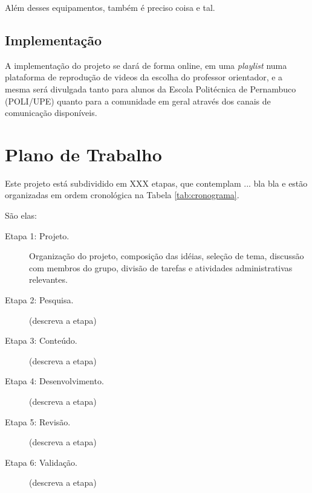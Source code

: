 \documentclass[a4paper,12pt]{article} %
\begin{document}
Além desses equipamentos, também é preciso coisa e tal.


\subsection{Implementação}

A implementação do projeto se dará de forma online, em uma \textit{playlist} numa plataforma de reprodução de videos da escolha do professor orientador, e a mesma será divulgada tanto para alunos da Escola Politécnica de Pernambuco (POLI/UPE) quanto para a comunidade em geral através dos canais de comunicação disponíveis.



\section{Plano de Trabalho}



Este projeto está subdividido em XXX etapas, que contemplam ... bla bla
e estão organizadas em ordem cronológica na Tabela \ref{tab:cronograma}.

São elas:

\begin{description}
 \item[Etapa 1: Projeto.] Organização do projeto, composição das idéias, seleção de tema, discussão com membros do grupo, divisão de tarefas e atividades administrativas relevantes.
 \item[Etapa 2: Pesquisa.] (descreva a etapa)
 \item[Etapa 3: Conteúdo.] (descreva a etapa)
 \item[Etapa 4: Desenvolvimento.] (descreva a etapa)
 \item[Etapa 5: Revisão.] (descreva a etapa)
 \item[Etapa 6: Validação.] (descreva a etapa)
\end{description}
\end{document}

